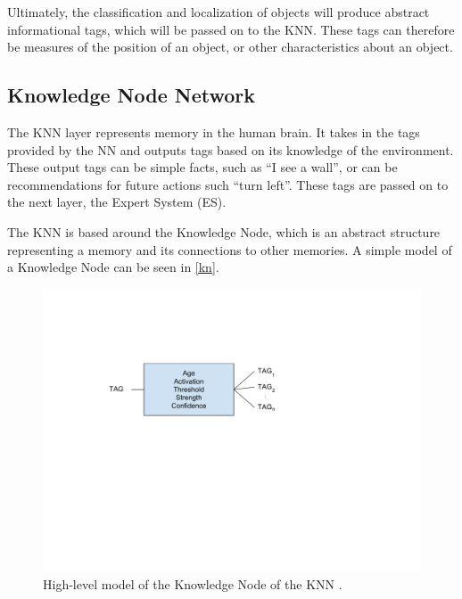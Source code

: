 \documentclass[titlepage,11pt]{article}
\newcommand{\ar}[1]{\autoref{#1}}
\begin{document}

Ultimately, the classification and localization of objects will produce abstract informational tags, which will be passed on to the KNN. These tags can therefore be measures of the position of an object, or other characteristics about an object.


\subsection{Knowledge Node Network}

The KNN layer represents memory in the human brain. It takes in the tags provided by the NN and outputs tags based on its knowledge of the environment. These output tags can be simple facts, such as ``I see a wall'', or can be recommendations for future actions such ``turn left''. These tags are passed on to the next layer, the Expert System (ES).

The KNN is based around the Knowledge Node, which is an abstract structure representing a memory and its connections to other memories. A simple model of a Knowledge Node can be seen in \ar{kn}.

\begin{figure}[!htb]
	\includegraphics[width=\columnwidth]{figures/kn.pdf}
	\caption[High-level model of the Knowledge Node of the KNN.]
	{High-level model of the Knowledge Node of the KNN \cite{vybihal-knowledge}.}
	\label{kn}
\end{figure}
\end{document}
